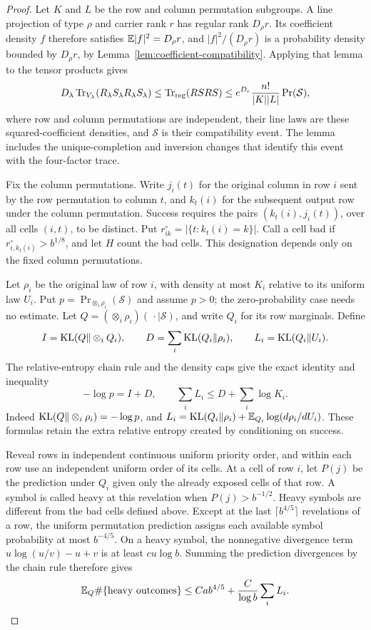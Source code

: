 \begin{proof}
Let $K$ and $L$ be the row and column permutation subgroups.
A line projection of type $\rho$ and carrier rank $r$ has regular
rank $D_\rho r$. Its coefficient density $f$ therefore satisfies
$\mathbb E|f|^2=D_\rho r$, and $|f|^2/(D_\rho r)$ is a probability
density bounded by $D_\rho r$, by
Lemma~\ref{lem:coefficient-compatibility}. Applying that lemma to
the tensor products gives
\[
 D_\lambda\operatorname{Tr}_{V_\lambda}
       (R_\lambda S_\lambda R_\lambda S_\lambda)
 \le\operatorname{Tr}_{\rm reg}(RSRS)\le
 e^{D_c}\frac{n!}{|K||L|}\Pr(\mathcal S),
\]
where row and column permutations are independent, their line laws
are these squared-coefficient densities, and $\mathcal S$ is their
compatibility event. The lemma includes the unique-completion and
inversion changes that identify this event with the four-factor trace.

Fix the column permutations.  Write $j_i(t)$ for the original column
in row $i$ sent by the row permutation to column $t$, and $k_t(i)$
for the subsequent output row under the column permutation.  Success
requires the pairs $(k_t(i),j_i(t))$, over all cells $(i,t)$, to be
distinct.  Put $r_{ik}^{\circ}=|\{t:k_t(i)=k\}|$.  Call a cell bad
if $r_{i,k_t(i)}^{\circ}>b^{1/8}$, and let $H$ count the bad cells.
This designation depends only on the fixed column permutations.

Let $\rho_i$ be the original law of row $i$, with density at most
$K_i$ relative to its uniform law $U_i$.  Put
$p=\Pr_{\otimes_i\rho_i}(\mathcal S)$ and assume $p>0$; the
zero-probability case needs no estimate.  Let
$Q=(\otimes_i\rho_i)(\,\cdot\mid\mathcal S)$, and write $Q_i$
for its row marginals.  Define
\[
 I=\operatorname{KL}(Q\Vert\otimes_iQ_i),\qquad
 D=\sum_i\operatorname{KL}(Q_i\Vert\rho_i),\qquad
 L_i=\operatorname{KL}(Q_i\Vert U_i).
\]
The relative-entropy chain rule and the density caps give the exact
identity and inequality
\begin{equation}\label{rec:biased-success-KL}
 -\log p=I+D,\qquad
 \sum_iL_i\le D+\sum_i\log K_i.
\end{equation}
Indeed $\operatorname{KL}(Q\Vert\otimes_i\rho_i)=-\log p$, and
$L_i=\operatorname{KL}(Q_i\Vert\rho_i)+
\mathbb E_{Q_i}\log(d\rho_i/dU_i)$.  These formulas retain the extra
relative entropy created by conditioning on success.

Reveal rows in independent continuous uniform priority order, and
within each row use an independent uniform order of its cells.  At
a cell of row $i$, let $P(j)$ be the prediction under $Q_i$ given
only the already exposed cells of that row.  A symbol is called
heavy at this revelation when $P(j)>b^{-1/2}$.  Heavy symbols are
different from the bad cells defined above.  Except at the last
$\lceil b^{4/5}\rceil$ revelations of a row, the uniform permutation
prediction assigns each available symbol probability at most
$b^{-4/5}$.  On a heavy symbol, the nonnegative divergence term
$u\log(u/v)-u+v$ is at least $c u\log b$.  Summing the prediction
divergences by the chain rule therefore gives
\begin{equation}\label{rec:biased-heavy-count}
 \mathbb E_Q\#\{\text{heavy outcomes}\}
 \le C ab^{4/5}+\frac{C}{\log b}\sum_iL_i.
\end{equation}


\end{proof}

